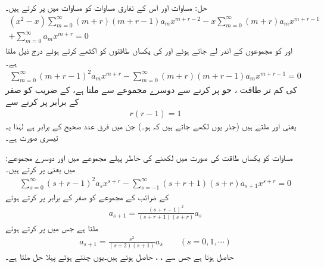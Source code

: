 حل: مساوات  اور اس کے تفارق مساوات  کو مساوات  میں پر کرتے ہیں۔
\begin{multline*}
(x^2-x)\sum_{m=0}^{\infty} (m+r)(m+r-1)a_mx^{m+r-2}-x\sum_{m=0}^{\infty}(m+r)a_m x^{m+r-1}\\
+\sum_{m=0}^{\infty} a_mx^{m+r}=0
\end{multline*}
  اور  کو مجموعوں کے اندر لے جاتے ہوئے اور  کی یکساں طاقتوں کو اکٹھے کرتے ہوئے درج ذیل ملتا ہے۔
\begin{align}\label{مساوات_بیسل_تیسری_صورت_الف}
\sum_{m=0}^{\infty} (m+r-1)^2a_mx^{m+r}-\sum_{m=0}^{\infty} (m+r)(m+r-1)a_mx^{m+r-1}=0
\end{align}
 کی کم تر طاقت ، جو   پر کرنے سے دوسرے مجموعے سے ملتا ہے، کے  ضریب  کو صفر کے برابر پر کرنے سے
\begin{align*}
r(r-1)=1
\end{align*}
یعنی  اور  ملتے ہیں (جذر یوں لکھے جاتے ہیں کہ  ہو۔) جن میں فرق عدد صحیح کے برابر  ہے لہٰذا یہ تیسری صورت ہے۔

:مساوات  کو یکساں طاقت کی صورت میں لکھنے کی خاطر پہلے مجموعے میں  اور دوسرے مجموعے میں  یعنی  پر کرتے ہیں۔
 \begin{align}
\sum_{s=0}^{\infty} (s+r-1)^2a_sx^{s+r}-\sum_{s=-1}^{\infty} (s+r+1)(s+r)a_{s+1}x^{s+r}=0
\end{align}
 کے  ضرائب کے مجموعے کو صفر کے برابر پر کرتے ہوئے
\begin{align*}
a_{s+1}=\frac{(s+r-1)^2}{(s+r+1)(s+r)}a_s
\end{align*}
ملتا ہے جس میں  پر کرتے ہوئے 
\begin{align}
a_{s+1}=\frac{s^2}{(s+2)(s+1)}a_s\quad \quad (s=0,1,\cdots)
\end{align}
حاصل ہوتا ہے  جس سے ، ،  حاصل ہوتے ہیں۔یوں  چنتے ہوئے پہلا حل  ملتا ہے۔

